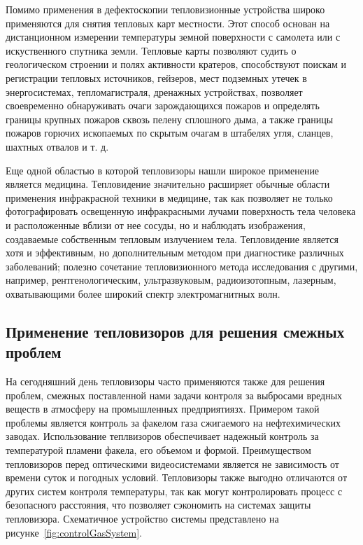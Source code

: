 \documentclass[14pt, a4paper]{extreport}
\begin{document}
	Помимо применения в дефектоскопии тепловизионные устройства широко применяются для снятия тепловых карт местности. Этот способ основан на дистанционном измерении температуры земной поверхности с самолета или с искуственного спутника земли. Тепловые карты позволяют судить о геологическом строении и полях активности кратеров, способствуют поискам и регистрации тепловых источников, гейзеров, мест подземных утечек в энергосистемах, тепломагистраля, дренажных устройствах, позволяет своевременно обнаруживать очаги зарождающихся пожаров и определять границы крупных пожаров сквозь пелену сплошного дыма, а также границы пожаров горючих ископаемых по скрытым очагам в штабелях угля, сланцев, шахтных отвалов и т. д.
	
	Еще одной областью в которой тепловизоры нашли широкое применение является медицина. Тепловидение значительно расширяет обычные области применения инфракрасной техники в медицине, так как позволяет не только фотографировать освещенную инфракрасными лучами поверхность тела человека и расположенные вблизи от нее сосуды, но и наблюдать изображения, создаваемые собственным тепловым излучением тела. Тепловидение является хотя и эффективным, но дополнительным методом при диагностике различных заболеваний; полезно сочетание тепловизионного метода исследования с другими, например, рентгенологическим, ультразвуковым, радиоизотопным, лазерным, охватывающими более широкий спектр электромагнитных волн.
	
\subsection{Применение тепловизоров для решения смежных проблем}
	На сегодняшний день тепловизоры часто применяются также для решения проблем, смежных поставленной нами задачи контроля за выбросами вредных веществ в атмосферу на промышленных предприятиязх. Примером такой проблемы является контроль за факелом газа сжигаемого на нефтехимических заводах. Использование теплвизоров обеспечивает надежный контроль за температурой пламени факела, его объемом и формой. Преимуществом тепловизоров перед оптическими видеосистемами является не зависимость от времени суток и погодных условий. Тепловизоры также выгодно отличаются от других систем контроля температуры, так как могут контролировать процесс с безопасного расстояния, что позволяет сэкономить на системах защиты тепловизора. Схематичное устройство системы представлено на рисунке~\ref{fig:controlGasSystem}.
	
\end{document}
